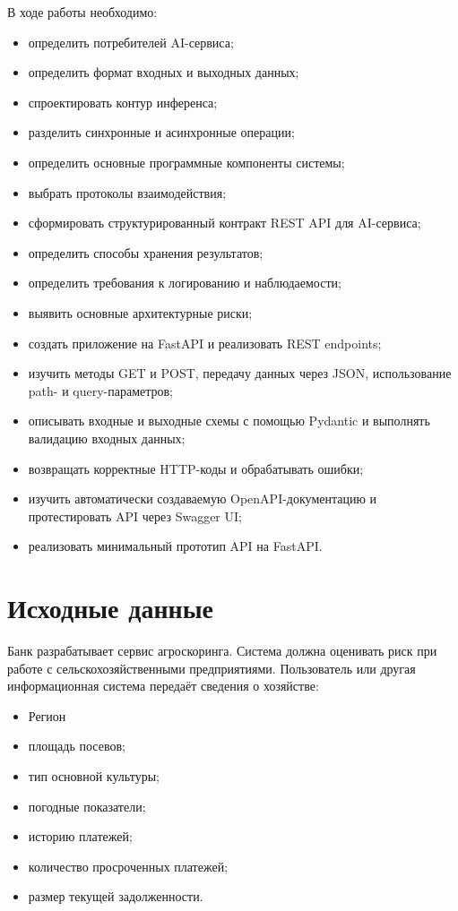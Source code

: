\documentclass[
]{article}
\begin{document}
В ходе работы необходимо:

\begin{itemize}
\item
  определить потребителей AI-сервиса;
\item
  определить формат входных и выходных данных;
\item
  спроектировать контур инференса;
\item
  разделить синхронные и асинхронные операции;
\item
  определить основные программные компоненты системы;
\item
  выбрать протоколы взаимодействия;
\item
  сформировать структурированный контракт REST API для AI-сервиса;
\item
  определить способы хранения результатов;
\item
  определить требования к логированию и наблюдаемости;
\item
  выявить основные архитектурные риски;
\item
  создать приложение на FastAPI и реализовать REST endpoints;
\item
  изучить методы GET и POST, передачу данных через JSON, использование
  path- и query-параметров;
\item
  описывать входные и выходные схемы с помощью Pydantic и выполнять
  валидацию входных данных;
\item
  возвращать корректные HTTP-коды и обрабатывать ошибки;
\item
  изучить автоматически создаваемую OpenAPI-документацию и
  протестировать API через Swagger UI;
\item
  реализовать минимальный прототип API на FastAPI.
\end{itemize}

\section{Исходные
данные}\label{ux438ux441ux445ux43eux434ux43dux44bux435-ux434ux430ux43dux43dux44bux435}

Банк разрабатывает сервис агроскоринга. Система должна оценивать риск
при работе с сельскохозяйственными предприятиями. Пользователь или
другая информационная система передаёт сведения о хозяйстве:

\begin{itemize}
\item
  Регион
\item
  площадь посевов;
\item
  тип основной культуры;
\item
  погодные показатели;
\item
  историю платежей;
\item
  количество просроченных платежей;
\item
  размер текущей задолженности.
\end{itemize}
\end{document}
